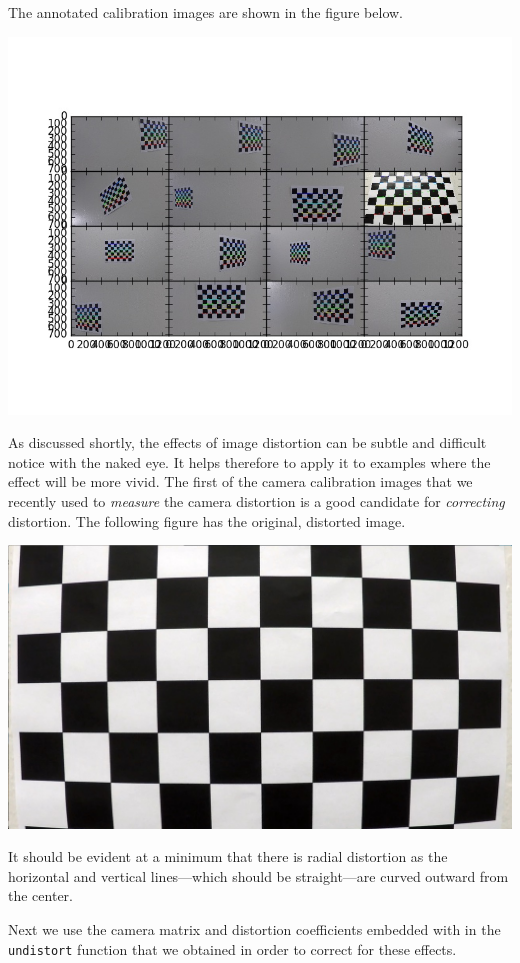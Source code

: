 \documentclass[11pt]{article}
\begin{document}
The annotated calibration images are shown in the figure below.

\includegraphics[width=.9\linewidth]{output_images/annotated_calibration_images.jpg}

As discussed shortly, the effects of image distortion can be
subtle and difficult notice with the naked eye.  It helps
therefore to apply it to examples where the effect will be more
vivid.  The first of the camera calibration images that we
recently used to \emph{measure} the camera distortion is a good
candidate for \emph{correcting} distortion.  The following figure has
the original, distorted image.

\includegraphics[width=.9\linewidth]{camera_cal/calibration1.jpg}

It should be evident at a minimum that there is radial
distortion as the horizontal and vertical lines---which should
be straight---are curved outward from the center.

Next we use the camera matrix and distortion coefficients
embedded with in the \texttt{undistort} function that we obtained in
order to correct for these effects.  
\end{document}
